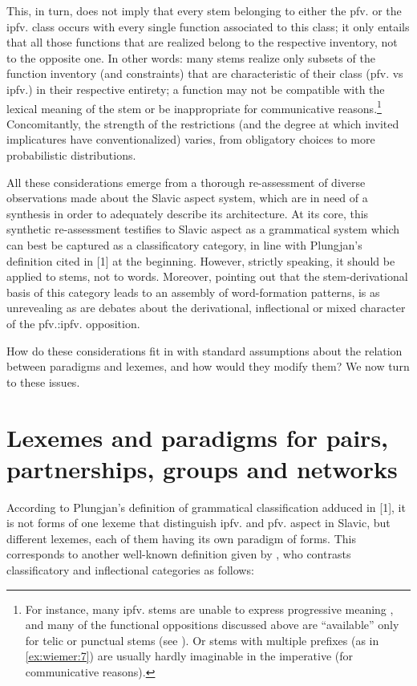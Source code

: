 \documentclass[output=paper]{langscibook}
\begin{document}
This, in turn, does not imply that every stem belonging to either the pfv. or the ipfv. class occurs with every single function associated to this class; it only entails that all those functions that are realized belong to the respective inventory, not to the opposite one. In other words: many stems realize only subsets of the function inventory (and constraints) that are characteristic of their class (pfv. vs ipfv.) in their respective entirety; a function may not be compatible with the lexical meaning of the stem or be inappropriate for communicative reasons.\footnote{For instance, many ipfv. stems are unable to express progressive meaning \citep{Lehmann1998}, and many of the functional oppositions discussed above are “available” only for telic or punctual stems (see ). Or stems with multiple prefixes (as in \ref{ex:wiemer:7}) are usually hardly imaginable in the imperative (for communicative reasons).} Concomitantly, the strength of the restrictions (and the degree at which invited implicatures have conventionalized) varies, from obligatory choices to more probabilistic distributions.

All these considerations emerge from a thorough re-assessment of diverse observations made about the Slavic aspect system, which are in need of a synthesis in order to adequately describe its architecture. At its core, this synthetic re-assessment testifies to Slavic aspect as a grammatical system which can best be captured as a classificatory category, in line with Plungjan’s definition cited in [1] at the beginning. However, strictly speaking, it should be applied to stems, not to words. Moreover, pointing out that the stem-derivational basis of this category leads to an assembly of word-formation patterns, is as unrevealing as are debates about the derivational, inflectional or mixed character of the pfv.:ipfv. opposition.

  How do these considerations fit in with standard assumptions about the relation between paradigms and lexemes, and how would they modify them? We now turn to these issues.

\section{Lexemes and paradigms for pairs, partnerships, groups and networks} \label{wiemer:3}


According to Plungjan’s definition of grammatical classification adduced in [1], it is not forms of one lexeme that distinguish ipfv. and pfv. aspect in Slavic, but different lexemes, each of them having its own paradigm of forms. This corresponds to another well-known definition given by \citet{Zaliznjak1967}, who contrasts classificatory and inflectional categories as follows:
\end{document}
